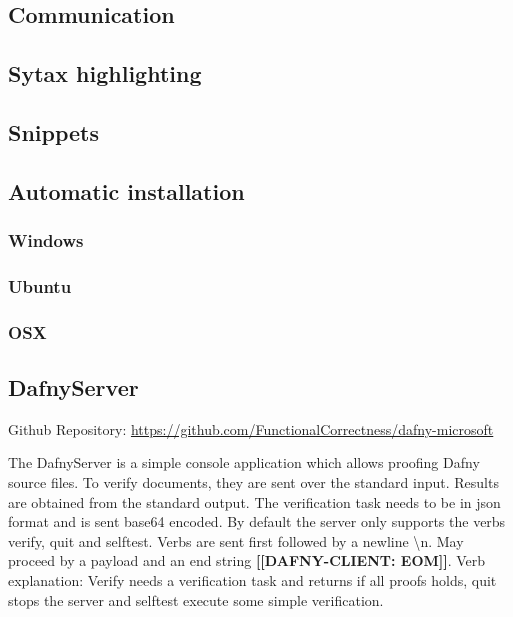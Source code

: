 \subsection{Communication}

\subsection{Sytax highlighting}

\subsection{Snippets}

\subsection{Automatic installation}
\subsubsection{Windows}

\subsubsection{Ubuntu}

\subsubsection{OSX}


\subsection{DafnyServer}
Github Repository: \href{https://github.com/FunctionalCorrectness/dafny-microsoft}{https://github.com/FunctionalCorrectness/dafny-microsoft}

The DafnyServer is a simple console application which allows proofing Dafny source files. To verify documents, they are sent over the standard input. Results are obtained from the standard output. The verification task needs to be in json format  and is sent base64 encoded. By default the server only supports the verbs verify, quit and selftest. Verbs are sent first followed by a newline \textbackslash{n}. May proceed by a payload and an end string \textbf{[[DAFNY-CLIENT: EOM]]}. \newline 
Verb explanation: Verify needs a verification task and returns if all proofs holds, quit stops the server and selftest execute some simple verification. \newline

